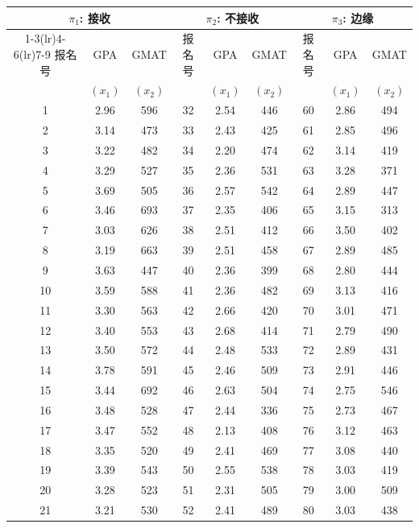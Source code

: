 \begin{mvtable}
\label{tab:11.6}
\begin{tabular}{ccccccccc}
\toprule
\multicolumn{3}{c}{$\pi_1$: 接收} & \multicolumn{3}{c}{$\pi_2$: 不接收} & \multicolumn{3}{c}{$\pi_3$: 边缘}\\
\cmidrule(lr){1-3}\cmidrule(lr){4-6}\cmidrule(lr){7-9}
报名号 & GPA & GMAT & 报名号 & GPA & GMAT & 报名号 & GPA & GMAT\\
 & $(x_1)$ & $(x_2)$ & & $(x_1)$ & $(x_2)$ & & $(x_1)$ & $(x_2)$\\
\midrule
1 & 2.96 & 596 & 32 & 2.54 & 446 & 60 & 2.86 & 494\\
2 & 3.14 & 473 & 33 & 2.43 & 425 & 61 & 2.85 & 496\\
3 & 3.22 & 482 & 34 & 2.20 & 474 & 62 & 3.14 & 419\\
4 & 3.29 & 527 & 35 & 2.36 & 531 & 63 & 3.28 & 371\\
5 & 3.69 & 505 & 36 & 2.57 & 542 & 64 & 2.89 & 447\\
6 & 3.46 & 693 & 37 & 2.35 & 406 & 65 & 3.15 & 313\\
7 & 3.03 & 626 & 38 & 2.51 & 412 & 66 & 3.50 & 402\\
8 & 3.19 & 663 & 39 & 2.51 & 458 & 67 & 2.89 & 485\\
9 & 3.63 & 447 & 40 & 2.36 & 399 & 68 & 2.80 & 444\\
10 & 3.59 & 588 & 41 & 2.36 & 482 & 69 & 3.13 & 416\\
11 & 3.30 & 563 & 42 & 2.66 & 420 & 70 & 3.01 & 471\\
12 & 3.40 & 553 & 43 & 2.68 & 414 & 71 & 2.79 & 490\\
13 & 3.50 & 572 & 44 & 2.48 & 533 & 72 & 2.89 & 431\\
14 & 3.78 & 591 & 45 & 2.46 & 509 & 73 & 2.91 & 446\\
15 & 3.44 & 692 & 46 & 2.63 & 504 & 74 & 2.75 & 546\\
16 & 3.48 & 528 & 47 & 2.44 & 336 & 75 & 2.73 & 467\\
17 & 3.47 & 552 & 48 & 2.13 & 408 & 76 & 3.12 & 463\\
18 & 3.35 & 520 & 49 & 2.41 & 469 & 77 & 3.08 & 440\\
19 & 3.39 & 543 & 50 & 2.55 & 538 & 78 & 3.03 & 419\\
20 & 3.28 & 523 & 51 & 2.31 & 505 & 79 & 3.00 & 509\\
21 & 3.21 & 530 & 52 & 2.41 & 489 & 80 & 3.03 & 438\\

\end{tabular}
\end{mvtable}
